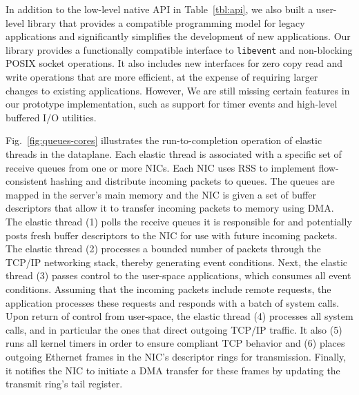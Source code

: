 
In addition to the low-level native \ix API in Table~\ref{tbl:api}, we also
built a user-level library that provides a compatible programming
model for legacy applications and significantly simplifies the
development of new applications.  Our library
provides a functionally compatible interface to \texttt{libevent} and non-blocking
POSIX socket operations. It also includes new
interfaces for zero copy read and write operations that are more efficient,
at the expense of requiring larger changes to existing applications. However, We
are still missing certain features in our prototype implementation, such as
support for timer events and high-level buffered I/O utilities.

 

Fig.~\ref{fig:queues-cores} illustrates the run-to-completion
operation of elastic threads in the \ix dataplane. Each elastic thread
is associated with a specific set of receive queues from one or more
NICs. Each NIC uses RSS to implement flow-consistent hashing and
distribute incoming packets to queues. The queues are mapped in the
server's main memory and the NIC is given a set of buffer descriptors
that allow it to transfer incoming packets to memory using DMA.  The
elastic thread (1) polls the receive queues it is responsible for and
potentially posts fresh buffer descriptors to the NIC for use with
future incoming packets. The elastic thread (2) processes a bounded
number of packets through the TCP/IP networking stack, thereby
generating event conditions. Next, the elastic thread (3) passes
control to the user-space applications, which consumes all event
conditions. Assuming that the incoming packets include remote
requests, the application processes these requests and responds with a
batch of system calls. Upon return of control from user-space, the
elastic thread (4) processes all system calls, and in particular the
ones that direct outgoing TCP/IP traffic. It also (5) runs all kernel
timers in order to ensure compliant TCP behavior and (6) places
outgoing Ethernet frames in the NIC's descriptor rings for
transmission. Finally, it notifies the NIC to initiate a DMA transfer
for these frames by updating the transmit ring's tail register. 

